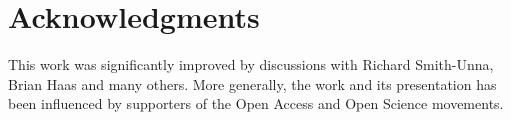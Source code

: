 \documentclass[10pt,letterpaper]{article}
\begin{document}
\section*{Acknowledgments}

This work was significantly improved by discussions with Richard Smith-Unna, Brian Haas and many others. More generally, the work and its presentation has been influenced by supporters of the Open Access and Open Science movements. 


\end{document}
